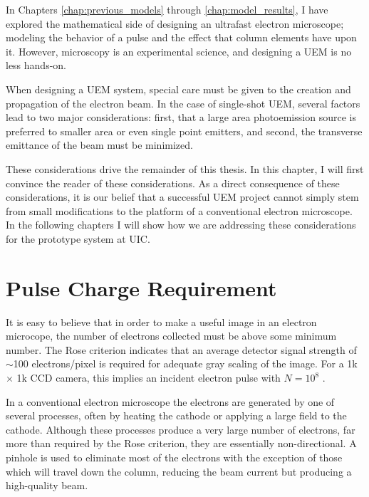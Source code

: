 
In Chapters \ref{chap:previous_models} through \ref{chap:model_results}, I have explored the mathematical side of designing an ultrafast electron microscope; modeling the behavior of a pulse and the effect that column elements have upon it.
However, microscopy is an experimental science, and designing a UEM is no less hands-on.

When designing a UEM system, special care must be given to the creation and propagation of the electron beam.
In the case of single-shot UEM, several factors lead to two major considerations: first, that a large area photoemission source is preferred to smaller area or even single point emitters, and second, the transverse emittance of the beam must be minimized.

These considerations drive the remainder of this thesis.
In this chapter, I will first convince the reader of these considerations.
As a direct consequence of these considerations, it is our belief that a successful UEM project cannot simply stem from small modifications to the platform of a conventional electron microscope.
In the following chapters I will show how we are addressing these considerations for the prototype system at UIC.

\section{Pulse Charge Requirement}

It is easy to believe that in order to make a useful image in an electron microcope, the number of electrons collected must be above some minimum number.
The Rose criterion \cite{rose_television_1948} indicates that an average detector signal strength of $\sim$100 electrons/pixel is required for adequate gray scaling of the image.
For a 1k $\times$ 1k CCD camera, this implies an incident electron pulse with $N=10^8$ \cite{armstrong_prospects_2007}.

In a conventional electron microscope the electrons are generated by one of several processes, often by heating the cathode or applying a large field to the cathode.
Although these processes produce a very large number of electrons, far more than required by the Rose criterion, they are essentially non-directional.
A pinhole is used to eliminate most of the electrons with the exception of those which will travel down the column, reducing the beam current but producing a high-quality beam. %

